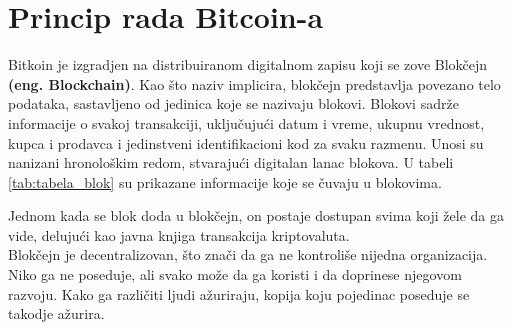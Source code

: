 \documentclass[a4paper]{article}
\begin{document}
\section{Princip rada Bitcoin-a}
\label{sec:princip_rada}

Bitkoin je izgradjen na distribuiranom digitalnom zapisu koji se zove Blokčejn \textbf{(eng. Blockchain)}. Kao što naziv implicira, blokčejn predstavlja povezano telo podataka, sastavljeno od jedinica koje se nazivaju blokovi. Blokovi sadrže informacije o svakoj transakciji, uključujući datum i vreme, ukupnu vrednost, kupca i prodavca i jedinstveni identifikacioni kod za svaku razmenu. Unosi su nanizani hronološkim redom, stvarajući digitalan lanac blokova.\cite{princip_rada} U tabeli \ref{tab:tabela_blok} su prikazane informacije koje se čuvaju u blokovima.
\\


\begin{table}[h!]

\begin{center}
\caption{Struktura blokova u blokčejnu.}

\captionsetup[subfloat]{labelformat=empty}
\quad
{}
\quad
{}

\label{tab:tabela_blok}
\end{center}
\end{table}

Jednom kada se blok doda u blokčejn, on postaje dostupan svima koji žele da ga vide, delujući kao javna knjiga transakcija kriptovaluta.
\\
Blokčejn je decentralizovan, što znači da ga ne kontroliše nijedna organizacija. Niko ga ne poseduje, ali svako može da ga koristi i da doprinese njegovom razvoju. Kako ga različiti ljudi ažuriraju, kopija koju pojedinac poseduje se takodje ažurira.
\end{document}

